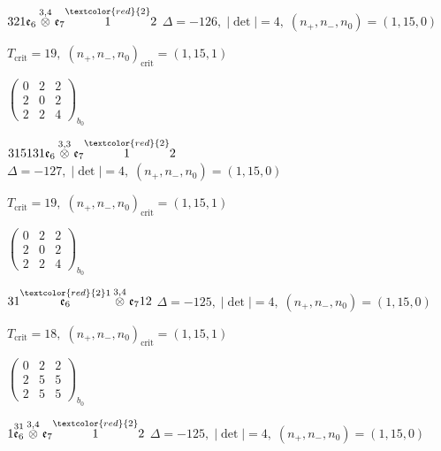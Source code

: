 \documentclass[10pt]{article}
\begin{document}
\smallskip

$321\mathfrak{e}_6\overset{3,4}{\otimes}\mathfrak{e}_7\overset{\textcolor{red}{2}}{1}2$ \quad $\Delta=-126,\; |\det|=4,\; (n_+,n_-,n_0)=(1,15,0)$

\hspace{1em}$T_{\text{crit}}=19,\; (n_+,n_-,n_0)_{\text{crit}}=(1,15,1)$

\hspace{2em}$\left(\begin{smallmatrix}0 & 2 & 2 \\ 2 & 0 & 2 \\ 2 & 2 & 4\end{smallmatrix}\right)_{\!b_0}$

\smallskip

$315131\mathfrak{e}_6\overset{3,3}{\otimes}\mathfrak{e}_7\overset{\textcolor{red}{2}}{1}2$ \quad $\Delta=-127,\; |\det|=4,\; (n_+,n_-,n_0)=(1,15,0)$

\hspace{1em}$T_{\text{crit}}=19,\; (n_+,n_-,n_0)_{\text{crit}}=(1,15,1)$

\hspace{2em}$\left(\begin{smallmatrix}0 & 2 & 2 \\ 2 & 0 & 2 \\ 2 & 2 & 4\end{smallmatrix}\right)_{\!b_0}$

\smallskip

$31\overset{\textcolor{red}{2}1}{\mathfrak{e}_6}\overset{3,4}{\otimes}\mathfrak{e}_712$ \quad $\Delta=-125,\; |\det|=4,\; (n_+,n_-,n_0)=(1,15,0)$

\hspace{1em}$T_{\text{crit}}=18,\; (n_+,n_-,n_0)_{\text{crit}}=(1,15,1)$

\hspace{2em}$\left(\begin{smallmatrix}0 & 2 & 2 \\ 2 & 5 & 5 \\ 2 & 5 & 5\end{smallmatrix}\right)_{\!b_0}$

$1\overset{31}{\mathfrak{e}_6}\overset{3,4}{\otimes}\mathfrak{e}_7\overset{\textcolor{red}{2}}{1}2$ \quad $\Delta=-125,\; |\det|=4,\; (n_+,n_-,n_0)=(1,15,0)$
\end{document}
